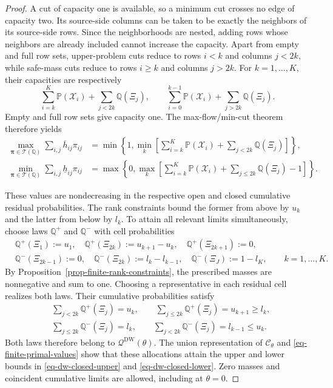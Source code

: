\documentclass[review,11pt,3p,authoryear,nopreprintline]{elsarticle}
\begin{document}
\begin{proof}
  A cut of capacity one is available, so a minimum cut crosses no edge of capacity two. Its source-side columns can be taken to be exactly the neighbors of its source-side rows. Since the neighborhoods are nested, adding rows whose neighbors are already included cannot increase the capacity. Apart from empty and full row sets, upper-problem cuts reduce to rows $i<k$ and columns $j<2k$, while safe-mass cuts reduce to rows $i\ge k$ and columns $j>2k$. For $k=1,\ldots,K$, their capacities are respectively
  \[
    \sum_{i=k}^{K}\mathbb P(\mathcal X_i)+\sum_{j<2k}\mathbb Q(\Xi_j),
    \qquad
    \sum_{i=0}^{k-1}\mathbb P(\mathcal X_i)+\sum_{j>2k}\mathbb Q(\Xi_j).
  \]
  Empty and full row sets give capacity one. The max-flow/min-cut theorem \citep{F.F56} therefore yields
  \begin{align*}
    \max_{\bm\pi\in\mathcal T(\mathbb Q)}\sum_{i,j}\overline h_{ij}\pi_{ij}
      &=\min\left\{1,\min_k\left[\sum_{i=k}^{K}\mathbb P(\mathcal X_i)
        +\sum_{j<2k}\mathbb Q(\Xi_j)\right]\right\},\\
    \min_{\bm\pi\in\mathcal T(\mathbb Q)}\sum_{i,j}\underline h_{ij}\pi_{ij}
      &=\max\left\{0,\max_k\left[\sum_{i=k}^{K}\mathbb P(\mathcal X_i)
        +\sum_{j\le2k}\mathbb Q(\Xi_j)-1\right]\right\}.
  \end{align*}

  These values are nondecreasing in the respective open and closed cumulative residual probabilities. The rank constraints bound the former from above by $u_k$ and the latter from below by $l_k$. To attain all relevant limits simultaneously, choose laws $\mathbb Q^+$ and $\mathbb Q^-$ with cell probabilities
  \begin{align*}
    &\mathbb Q^+(\Xi_1):=u_1,\quad
      \mathbb Q^+(\Xi_{2k}):=u_{k+1}-u_k,\quad
      \mathbb Q^+(\Xi_{2k+1}):=0,\\
    &\mathbb Q^-(\Xi_{2k-1}):=0,\quad
      \mathbb Q^-(\Xi_{2k}):=l_k-l_{k-1},\quad
      \mathbb Q^-(\Xi_J):=1-l_K,
      \qquad k=1,\ldots,K.
  \end{align*}
  By Proposition~\ref{prop-finite-rank-constraints}, the prescribed masses are nonnegative and sum to one. Choosing a representative in each residual cell realizes both laws. Their cumulative probabilities satisfy
  \begin{align*}
    &\sum_{j<2k}\mathbb Q^+(\Xi_j)=u_k,
      \qquad \sum_{j\le2k}\mathbb Q^+(\Xi_j)=u_{k+1}\ge l_k,\\
    &\sum_{j\le2k}\mathbb Q^-(\Xi_j)=l_k,
      \qquad \sum_{j<2k}\mathbb Q^-(\Xi_j)=l_{k-1}\le u_k.
  \end{align*}
  Both laws therefore belong to $\mathcal Q^{\mathrm{DW}}(\theta)$. The union representation of $\mathcal C_\theta$ and \eqref{eq-finite-primal-values} show that these allocations attain the upper and lower bounds in \eqref{eq-dw-closed-upper} and \eqref{eq-dw-closed-lower}. Zero masses and coincident cumulative limits are allowed, including at $\theta=0$.


\end{proof}
\end{document}
